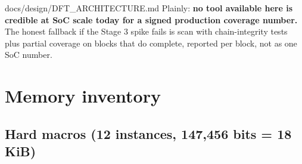 \begin{relocated}{docs/design/DFT_ARCHITECTURE.md}
Plainly: \textbf{no tool available here is credible at SoC scale today
for a signed production coverage number.} The honest fallback if the
Stage 3 spike fails is scan with chain-integrity tests plus partial
coverage on blocks that do complete, reported per block, not as one SoC
number.

\section{Memory inventory}\label{tm:ch:dft-architecture:3-memory-inventory}

\subsection{Hard macros (12 instances, 147,456 bits = 18 KiB)}\label{tm:ch:dft-architecture:31-hard-macros-12-instances-147456-bits-18-kib}

{\small\setlength{\tabcolsep}{4pt}

}
\end{relocated}
